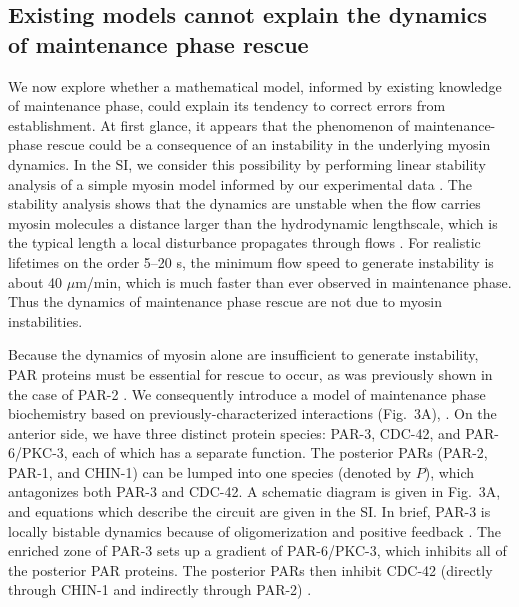 \documentclass[11pt]{article}
\newcommand{\6}[1]{#1_{\text{6}}}
\newcommand{\3}[1]{#1_{\text{3}}}
\begin{document}
\subsection*{Existing models cannot explain the dynamics of maintenance phase rescue }
We now explore whether a mathematical model, informed by existing knowledge of maintenance phase, could explain its tendency to correct errors from establishment. At first glance, it appears that the phenomenon of maintenance-phase rescue could be a consequence of an instability in the underlying myosin dynamics. In the SI, we consider this possibility by performing linear stability analysis of a simple myosin model informed by our experimental data \citep{mayer2010anisotropies, bois2011pattern}. The stability analysis shows that the dynamics are unstable when the flow carries myosin molecules a distance larger than the hydrodynamic lengthscale, which is the typical length a local disturbance propagates through flows \citep{mayer2010anisotropies}. For realistic lifetimes on the order 5--20 s, the minimum flow speed to generate instability is about 40 $\mu$m/min, which is much faster than ever observed in maintenance phase. Thus the dynamics of maintenance phase rescue are not due to myosin instabilities.

Because the dynamics of myosin alone are insufficient to generate instability, PAR proteins must be essential for rescue to occur, as was previously shown in the case of PAR-2 \citep{zonies2010symmetry}. We consequently introduce a model of maintenance phase biochemistry based on previously-characterized interactions (Fig.\ 3A), \citep{lang2017proteins}. On the anterior side, we have three distinct protein species: PAR-3, CDC-42, and PAR-6/PKC-3, each of which has a separate function. The posterior PARs (PAR-2, PAR-1, and CHIN-1) can be lumped into one species (denoted by $P$), which antagonizes both PAR-3 and CDC-42. A schematic diagram is given in Fig.\ 3A, and equations which describe the circuit are given in the SI. In brief, PAR-3 is locally bistable dynamics because of oligomerization and positive feedback \cite{lang2023oligomerization}. The enriched zone of PAR-3 sets up a gradient of PAR-6/PKC-3, which inhibits all of the posterior PAR proteins. The posterior PARs then inhibit CDC-42 (directly through CHIN-1 and indirectly through PAR-2) \citep{munro2004cortical, sailer2015dynamic}. 
\end{document}

